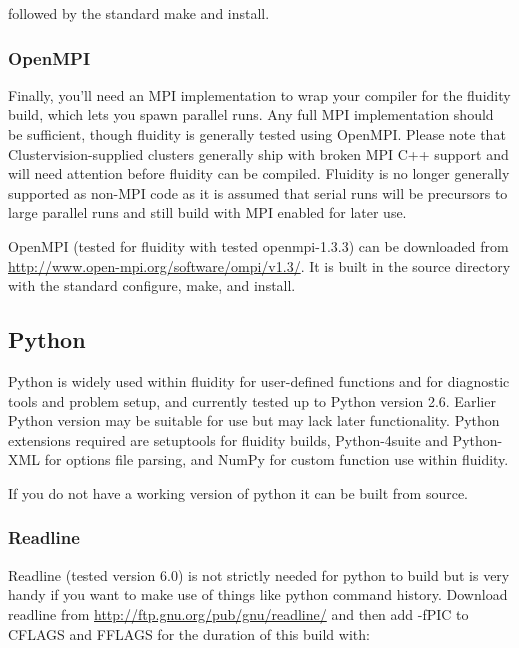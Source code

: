 followed by the standard make and install.

\subsubsection{OpenMPI}
\label{sect:required_libraries_compilers_openmpi}

Finally, you'll need an MPI implementation to wrap your compiler for the
fluidity build, which lets you spawn parallel runs. Any full MPI implementation
should be sufficient, though fluidity is generally tested using OpenMPI. Please
note that Clustervision-supplied clusters generally ship with broken MPI C++
support and will need attention before fluidity can be compiled. Fluidity is no
longer generally supported as non-MPI code as it is assumed that serial runs
will be precursors to large parallel runs and still build with MPI enabled for
later use.

OpenMPI (tested for fluidity with tested openmpi-1.3.3) can be downloaded from
\url{http://www.open-mpi.org/software/ompi/v1.3/}. It is built in the source
directory with the standard configure, make, and install.

\subsection{Python}
\label{sect:required_libraries_python}

Python is widely used within fluidity for user-defined functions and for
diagnostic tools and problem setup, and currently tested up to Python version
2.6. Earlier Python version may be suitable for use but may lack later
functionality. Python extensions required are setuptools for fluidity builds,
Python-4suite and Python-XML for options file parsing, and NumPy for custom
function use within fluidity.

If you do not have a working version of python it can be built from source. 

\subsubsection{Readline}
\label{sect:required_libraries_python_readline}

Readline (tested version 6.0) is not strictly needed for python to build but is
very handy if you want to make use of things like python command history.
Download readline from \url{http://ftp.gnu.org/pub/gnu/readline/} and then add
-fPIC to CFLAGS and FFLAGS for the duration of this build with:

